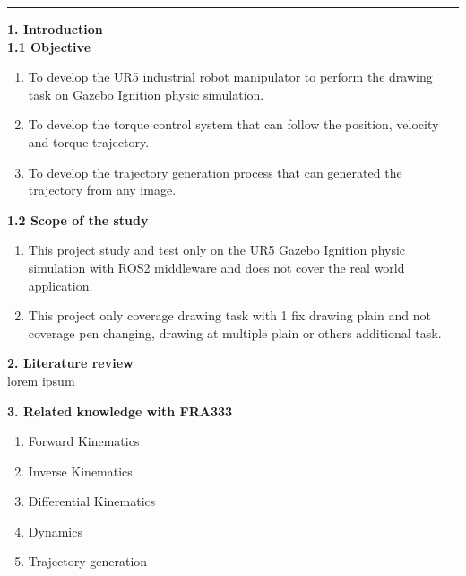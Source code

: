 \documentclass[10pt]{article}
\begin{document}
\vspace{0.4cm}
\noindent
\rule{\textwidth}{1pt}

\linespread{1.5} 
\vspace{0.2cm}
\noindent
\large
\textbf{1. Introduction} \\
\textbf{1.1 Objective}  \\
\normalsize
\vspace*{-0.9\baselineskip}
\begin{enumerate}[nosep, itemsep=-2pt] 
    \item To develop the UR5 industrial robot manipulator to perform the drawing task on Gazebo Ignition physic simulation. 
    \item To develop the torque control system that can follow the position, velocity and torque trajectory.
    \item To develop the trajectory generation process that can generated the trajectory from any image.
\end{enumerate}
  
\vspace{8pt}
\noindent
\large 
\textbf{1.2 Scope of the study} \\ 
\normalsize
\vspace*{-0.9\baselineskip} 
\begin{enumerate}[nosep, itemsep=-2pt] 
    \item This project study and test only on the UR5 Gazebo Ignition physic simulation with ROS2 middleware and does not cover the real world application.
    \item This project only coverage drawing task with 1 fix drawing plain and not coverage pen changing, drawing at multiple plain or others additional task.
\end{enumerate}

\large
\noindent
\textbf{2. Literature review} \\
\indent
lorem ipsum

\large
\noindent
\textbf{3. Related knowledge with FRA333} \\
\normalsize
\vspace*{-0.9\baselineskip} 
\begin{enumerate}[nosep, itemsep=-2pt]
    \item Forward Kinematics 
    \item Inverse Kinematics
    \item Differential Kinematics
    \item Dynamics
    \item Trajectory generation
\end{enumerate}
\end{document}
